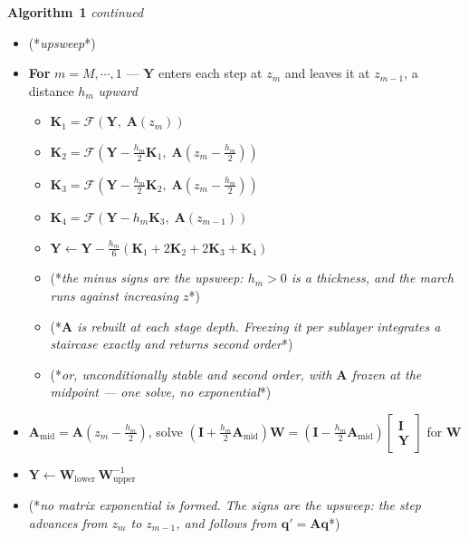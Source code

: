 \documentclass[11pt,a4paper]{article}
\newcommand{\bI}{\mathbf{I}}
\newcommand{\bA}{\mathbf{A}}
\newcommand{\bq}{\mathbf{q}}
\newcommand{\bY}{\mathbf{Y}}
\begin{document}
\vspace{4mm}
\noindent\begin{minipage}{\linewidth}
\textbf{Algorithm}~\textbf{1} {\em continued\/}\newline
\vspace{2mm}

\begin{itemize}
\item (*{\em upsweep\/}*)

\item \textbf{For} $m=M,\cdots,1$ \quad --- $\bY$ enters each step at $z_m$ and
      leaves it at $z_{m-1}$, a distance $h_m$ \emph{upward}
\begin{itemize}
\item $\mathbf{K}_1 = \mathcal{F}\!\left(\bY,\;\bA(z_{m})\right)$
\item $\mathbf{K}_2 = \mathcal{F}\!\left(\bY-\tfrac{h_m}{2}\mathbf{K}_1,\;
        \bA(z_{m}-\tfrac{h_m}{2})\right)$
\item $\mathbf{K}_3 = \mathcal{F}\!\left(\bY-\tfrac{h_m}{2}\mathbf{K}_2,\;
        \bA(z_{m}-\tfrac{h_m}{2})\right)$
\item $\mathbf{K}_4 = \mathcal{F}\!\left(\bY-h_m\mathbf{K}_3,\;
        \bA(z_{m-1})\right)$
\item $\bY \leftarrow \bY
        - \tfrac{h_m}{6}\left(\mathbf{K}_1+2\mathbf{K}_2+2\mathbf{K}_3
        +\mathbf{K}_4\right)$
\item (*{\em the minus signs are the upsweep: $h_m>0$ is a thickness, and the
      march runs against increasing $z$\/}*)
\item (*{\em $\bA$ is rebuilt at each stage depth.  Freezing it per sublayer
      integrates a staircase exactly and returns second order\/}*)
\end{itemize}

\begin{itemize}
\item (*{\em or, unconditionally stable and second order, with $\bA$ frozen at
      the midpoint --- one solve, no exponential\/}*)
\end{itemize}
\item $\bA_{\mathrm{mid}}=\bA\!\left(z_m-\tfrac{h_m}{2}\right)$, \quad
      solve
      $\left(\bI+\tfrac{h_m}{2}\bA_{\mathrm{mid}}\right)\mathbf{W}
       = \left(\bI-\tfrac{h_m}{2}\bA_{\mathrm{mid}}\right)
         \begin{bmatrix}\bI\\ \bY\end{bmatrix}$
      \quad for $\mathbf{W}$
\item $\bY \leftarrow \mathbf{W}_{\mathrm{lower}}\,
        \mathbf{W}_{\mathrm{upper}}^{-1}$
\item (*{\em no matrix exponential is formed.  The signs are the upsweep: the
      step advances from $z_m$ to $z_{m-1}$, and follows from $\bq'=\bA\bq$\/}*)


\end{itemize}
\end{minipage}
\end{document}
